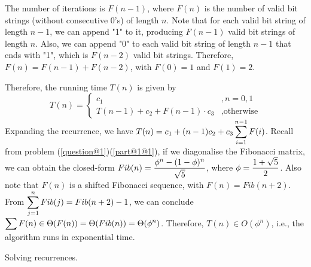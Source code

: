 \documentclass[answers]{exam}
\begin{document}
\begin{questions}
\begin{parts}
\begin{solution}
            The number of iterations is $F(n-1)$, where $F(n)$ is the number of valid bit strings (without consecutive 0's) of length $n$.
            Note that for each valid bit string of length $n-1$, we can append "1" to it, producing $F(n-1)$ valid bit strings of length $n$.
            Also, we can append "0" to each valid bit string of length $n-1$ that ends with "1", which is $F(n-2)$ valid bit strings.
            Therefore, $F(n)=F(n-1)+F(n-2)$, with $F(0)=1$ and $F(1)=2$.

            Therefore, the running time $T(n)$ is given by \[
            T(n)=\begin{cases}
                c_1 &, n=0,1\\
                T(n-1)+c_2+F(n-1)\cdot c_3 &,\text{otherwise}
            \end{cases}\]
            Expanding the recurrence, we have $\displaystyle T(n)=c_1+(n-1)c_2+c_3\sum_{i=1}^{n-1}F(i)$.
            Recall from problem (\ref{question@1})(\ref{part@1@1}), if we diagonalise the Fibonacci matrix, we can obtain the closed-form $\displaystyle Fib(n)=\frac{\phi^n-(1-\phi)^n}{\sqrt{5}}$, where $\displaystyle\phi=\frac{1+\sqrt{5}}{2}$.
            Also note that $F(n)$ is a shifted Fibonacci sequence, with $F(n)=Fib(n+2)$.
            From $\displaystyle\sum_{j=1}^{n}Fib(j)=Fib(n+2)-1$, we can conclude $\displaystyle\sum F(n)\in\Theta(F(n))=\Theta(Fib(n))=\Theta(\phi^n)$.
            Therefore, $T(n)\in O(\phi^n)$, i.e., the algorithm runs in exponential time.
        \end{solution}

    \end{parts}

    \question[20] Solving recurrences.
    \begin{parts}
        

\end{parts}
\end{questions}
\end{document}
